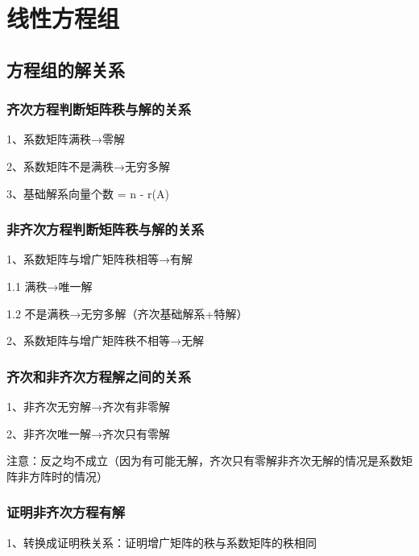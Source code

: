 \chapter{线性方程组}

\section{方程组的解关系}



\subsection{齐次方程判断矩阵秩与解的关系}

1、系数矩阵满秩→零解

2、系数矩阵不是满秩→无穷多解

3、基础解系向量个数 = n - r(A)



\subsection{非齐次方程判断矩阵秩与解的关系}

1、系数矩阵与增广矩阵秩相等→有解

1.1 满秩→唯一解

1.2 不是满秩→无穷多解（齐次基础解系+特解）

2、系数矩阵与增广矩阵秩不相等→无解



\subsection{齐次和非齐次方程解之间的关系}

1、非齐次无穷解→齐次有非零解

2、非齐次唯一解→齐次只有零解

注意：反之均不成立（因为有可能无解，齐次只有零解非齐次无解的情况是系数矩阵非方阵时的情况）



\subsection{证明非齐次方程有解}

1、转换成证明秩关系：证明增广矩阵的秩与系数矩阵的秩相同

